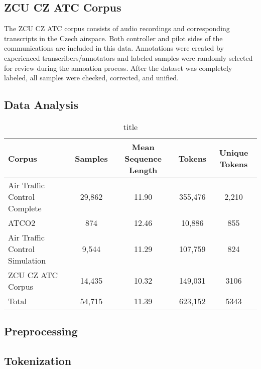 \documentclass[12pt]{article}
\begin{document}
\subsection{ZCU CZ ATC Corpus}
The ZCU CZ ATC corpus consists of audio recordings and corresponding transcripts in the Czech airspace. Both controller and pilot sides of the
communications are included in this data. Annotations were created by experienced transcribers/annotators and labeled samples were randomly selected
for review during the annoation process. After the dataset was completely labeled, all samples were checked, corrected, and
unified\cite{smidl_air_2019}.

\subsection{Data Analysis}
\begin{table}
    \centering
    \begin{tabular}{l c c c c}
        Corpus                         & Samples & Mean Sequence Length & Tokens  & Unique Tokens \\
        \toprule
        Air Traffic Control Complete   & 29,862  & 11.90                & 355,476 & 2,210         \\
        ATCO2                          & 874     & 12.46                & 10,886  & 855           \\
        Air Traffic Control Simulation & 9,544   & 11.29                & 107,759 & 824           \\
        ZCU CZ ATC Corpus              & 14,435  & 10.32                & 149,031 & 3106          \\
        \bottomrule
        Total                          & 54,715  & 11.39                & 623,152 & 5343          \\
    \end{tabular}
    \caption[short]{title}
\end{table}

\subsection{Preprocessing}

\subsection{Tokenization}

\newpage


\end{document}
